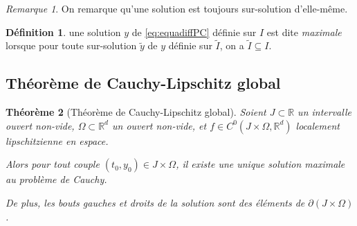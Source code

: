 \documentclass{report}
\newtheorem{thm}{Théorème}[chapter]
\theoremstyle{definition}
\newtheorem{déf}[thm]{Définition}
\theoremstyle{remark}
\newtheorem*{rmq}{Remarque}
\numberwithin{equation}{section}
\newcommand{\R}{\mathbb R}
\begin{document}
			\begin{rmq} On remarque qu'une solution est toujours sur-solution d'elle-même.
			\end{rmq}

			\begin{déf} une solution $y$ de \eqref{eq:equadiffPC} définie sur $I$ est dite \textit{maximale} lorsque pour toute sur-solution $\widetilde y$ de
			$y$ définie sur $\widetilde I$, on a $\widetilde I \subseteq I$.
			\end{déf}

		\subsection{Théorème de Cauchy-Lipschitz global}
			\begin{thm}[Théorème de Cauchy-Lipschitz global] Soient $J \subset \R$ un intervalle ouvert non-vide, $\Omega \subset \R^d$ un ouvert non-vide, et
			$f \in C^0(J \times \Omega, \R^d)$ localement lipschitzienne en espace.

			Alors pour tout couple $(t_0, y_0) \in J \times \Omega$, il existe une unique solution maximale au problème de Cauchy.

			De plus, les bouts gauches et droits de la solution sont des éléments de $\partial(J \times \Omega)$\footnotemark.
			\end{thm}
\end{document}
